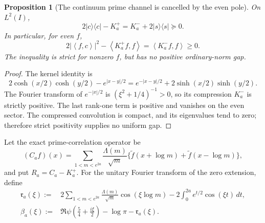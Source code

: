 \documentclass[11pt]{article}
\newtheorem{proposition}[theorem]{Proposition}
\theoremstyle{remark}
\newcommand{\ip}[2]{\left\langle #1,#2\right\rangle}
\begin{document}
\begin{proposition}[The continuum prime channel is cancelled by the even pole]
\label{prop:v130-continuum-cancellation}
On $L^2(I)$,
\begin{equation}\label{eq:v130-kernel-factorization}
 2|c\rangle\langle c|-K_a^+=K_a^-+2|s\rangle\langle s|\succeq0.
\end{equation}
In particular, for even $f$,
\[
 2|\ip f c|^2-\ip{K_a^+f}f=\ip{K_a^-f}f\ge0.
\]
The inequality is strict for nonzero $f$, but has no positive
ordinary-norm gap.
\end{proposition}
\begin{proof}
The kernel identity is
\[
 2\cosh(x/2)\cosh(y/2)-e^{|x-y|/2}
 =e^{-|x-y|/2}+2\sinh(x/2)\sinh(y/2).
\]
The Fourier transform of $e^{-|x|/2}$ is
$(\xi^2+1/4)^{-1}>0$, so its compression $K_a^-$ is strictly
positive. The last rank-one term is positive and vanishes on the even
sector. The compressed convolution is compact, and its eigenvalues
tend to zero; therefore strict positivity supplies no uniform gap.
\end{proof}

Let the exact prime-correlation operator be
\[
 (C_af)(x)=\sum_{1<m<e^{2a}}\frac{\Lambda(m)}{\sqrt m}
 \{\widetilde f(x+\log m)+\widetilde f(x-\log m)\},
\]
and put $R_a=C_a-K_a^+$. For the unitary Fourier transform of the zero
extension, define
\begin{align}
 \mathfrak r_a(\xi)
 :={}&2\sum_{1<m<e^{2a}}\frac{\Lambda(m)}{\sqrt m}
                 \cos(\xi\log m)
       -2\int_0^{2a}e^{t/2}\cos(\xi t)\,dt, \label{eq:v130-r-symbol}\\
 \beta_a(\xi)
 :={}&\Re\psi\!\left(\frac54+\frac{i\xi}{2}\right)-\log\pi
       -\mathfrak r_a(\xi). \label{eq:v130-beta}
\end{align}
\end{document}

